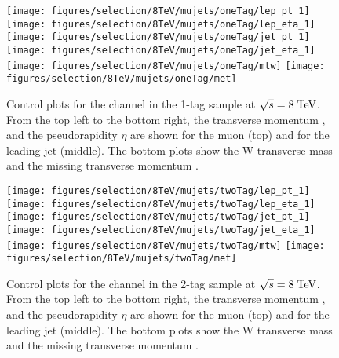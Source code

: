 \begin{figure}
  \centering
  \texttt{[image: figures/selection/8TeV/mujets/oneTag/lep\_pt\_1]}
  \texttt{[image: figures/selection/8TeV/mujets/oneTag/lep\_eta\_1]}
  \texttt{[image: figures/selection/8TeV/mujets/oneTag/jet\_pt\_1]}
  \texttt{[image: figures/selection/8TeV/mujets/oneTag/jet\_eta\_1]}
  \texttt{[image: figures/selection/8TeV/mujets/oneTag/mtw]}
  \texttt{[image: figures/selection/8TeV/mujets/oneTag/met]}
  \caption[Control plots for the \mujets{} channel in the 1-tag
    sample at $\sqrt{s} = 8 \TeV{}$]{Control plots for the \mujets{} channel in the 1-tag
    sample at $\sqrt{s} = 8 \TeV{}$.  From the top left to the bottom right, the transverse
    momentum \pt{}, and the pseudorapidity $\eta$ are shown for the
    muon (top) and for the leading jet (middle). The bottom plots show
    the W transverse mass \mtw{} and the missing transverse
    momentum \met{}. 
  }
  \label{fig:2012mu_1tag}
\end{figure}
%
\begin{figure}
  \centering
  \texttt{[image: figures/selection/8TeV/mujets/twoTag/lep\_pt\_1]}
  \texttt{[image: figures/selection/8TeV/mujets/twoTag/lep\_eta\_1]}
  \texttt{[image: figures/selection/8TeV/mujets/twoTag/jet\_pt\_1]}
  \texttt{[image: figures/selection/8TeV/mujets/twoTag/jet\_eta\_1]}
  \texttt{[image: figures/selection/8TeV/mujets/twoTag/mtw]}
  \texttt{[image: figures/selection/8TeV/mujets/twoTag/met]}
  \caption[Control plots for the \mujets{} channel in the 2-tag
    sample at $\sqrt{s} = 8 \TeV{}$]{Control plots for the \mujets{} channel in the 2-tag
    sample at $\sqrt{s} = 8 \TeV{}$.  From the top left to the bottom right, the transverse
    momentum \pt{}, and the pseudorapidity $\eta$ are shown for the
    muon (top) and for the leading jet (middle). The bottom plots show
    the W transverse mass \mtw{} and the missing transverse
    momentum \met{}. 
  }
  \label{fig:2012mu_2tag}
\end{figure}

